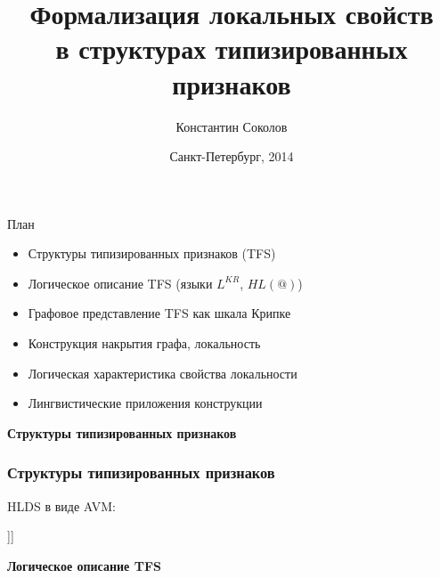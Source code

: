 \documentclass{beamer}
\begin{document}
\title{\Large{Формализация локальных свойств\\в структурах типизированных признаков}}
\author{Константин Соколов}
\date{Санкт-Петербург, 2014} 
\begin{frame}
    \thispagestyle{empty}
    \titlepage
\end{frame}

\begin{frame}{План}
    \setcounter{framenumber}{1}
    \begin{itemize}
        \item Структуры типизированных признаков (TFS)
        \item Логическое описание TFS (языки $L^{KR}$, $HL(@)$)
        \item Графовое представление TFS как шкала Крипке
        \item Конструкция накрытия графа, локальность
        \item Логическая характеристика свойства локальности
        \item Лингвистические приложения конструкции  %
    \end{itemize}
\end{frame}

\begin{frame}{}
\begin{center}
	\textbf{Структуры типизированных признаков}
\end{center}
\end{frame}

\begin{frame}[fragile]
\frametitle{Структуры типизированных признаков}
HLDS в виде AVM:\\
\begin{center}
	\begin{avm}
	[{action} predicate & on \cr
    	      Mood & imp \cr 
        	  Actor & @{1} \cr 
	          Patient & [{thing} predicate & @{2} лампа \cr
    	                         Num & sg \cr 
        	                     Modifier & [{q-color} predicate & красный\_adj ]]]
	\end{avm}
\end{center}	
\end{frame}

\begin{frame}{}
\begin{center}
	\textbf{Логическое описание TFS}
\end{center}
\end{frame}
\end{document}

